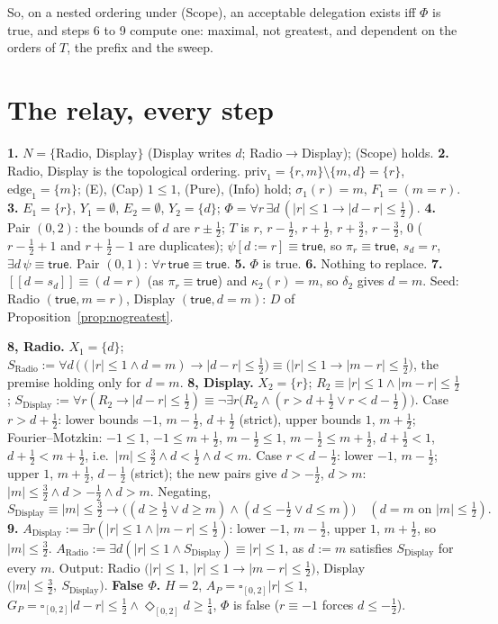 \documentclass[10pt]{article}
\theoremstyle{tplain}\newtheorem{theorem}{Theorem}\newtheorem{lemma}[theorem]{Lemma}\newtheorem{proposition}[theorem]{Proposition}\newtheorem{corollary}[theorem]{Corollary}
\theoremstyle{tdef}\newtheorem{definition}[theorem]{Definition}
\newcommand{\priv}{\mathrm{priv}}\newcommand{\edge}{\mathrm{edge}}
\newcommand{\TRUE}{\mathsf{true}}\newcommand{\FALSE}{\mathsf{false}}
\newcommand{\df}[1]{[\![#1]\!]}
\begin{document}
So, on a nested ordering under (Scope), an acceptable delegation exists iff $\Phi$ is true, and steps 6 to 9 compute one: maximal, not greatest, and dependent on the orders of $T$, the prefix and the sweep.

\section{The relay, every step}\label{sec:relay}
\textbf{1.} $N=\{$Radio, Display$\}$ (Display writes $d$; Radio$\to$Display); (Scope) holds. \textbf{2.} Radio, Display is the topological ordering. $\priv_1=\{r,m\}\setminus\{m,d\}=\{r\}$, $\edge_1=\{m\}$; (E), (Cap) $1\le1$, (Pure), (Info) hold; $\sigma_1(r)=m$, $F_1=(m=r)$. \textbf{3.} $E_1=\{r\}$, $Y_1=\emptyset$, $E_2=\emptyset$, $Y_2=\{d\}$; $\Phi=\forall r\,\exists d\,(|r|\le1\to|d-r|\le\frac12)$. \textbf{4.} Pair $(0,2)$: the bounds of $d$ are $r\pm\frac12$; $T$ is $r$, $r-\frac12$, $r+\frac12$, $r+\frac32$, $r-\frac32$, $0$ ($r-\frac12+1$ and $r+\frac12-1$ are duplicates); $\psi[d:=r]\equiv\TRUE$, so $\pi_r\equiv\TRUE$, $s_d=r$, $\exists d\,\psi\equiv\TRUE$. Pair $(0,1)$: $\forall r\,\TRUE\equiv\TRUE$. \textbf{5.} $\Phi$ is true. \textbf{6.} Nothing to replace. \textbf{7.} $\df{d=s_d}\equiv(d=r)$ (as $\pi_r\equiv\TRUE$) and $\kappa_2(r)=m$, so $\delta_2$ gives $d=m$. Seed: Radio $(\TRUE,m=r)$, Display $(\TRUE,d=m)$: $D$ of Proposition~\ref{prop:nogreatest}.

\textbf{8, Radio.} $X_1=\{d\}$; $S_{\mathrm{Radio}}:=\forall d\,\big((|r|\le1\wedge d=m)\to|d-r|\le\frac12\big)\equiv\big(|r|\le1\to|m-r|\le\frac12\big)$, the premise holding only for $d=m$.
\textbf{8, Display.} $X_2=\{r\}$; $R_2\equiv|r|\le1\wedge|m-r|\le\frac12$; $S_{\mathrm{Display}}:=\forall r(R_2\to|d-r|\le\frac12)\equiv\neg\exists r\big(R_2\wedge(r>d+\frac12\vee r<d-\frac12)\big)$. Case $r>d+\frac12$: lower bounds $-1$, $m-\frac12$, $d+\frac12$ (strict), upper bounds $1$, $m+\frac12$; Fourier--Motzkin: $-1\le1$, $-1\le m+\frac12$, $m-\frac12\le1$, $m-\frac12\le m+\frac12$, $d+\frac12<1$, $d+\frac12<m+\frac12$, i.e.\ $|m|\le\frac32\wedge d<\frac12\wedge d<m$. Case $r<d-\frac12$: lower $-1$, $m-\frac12$; upper $1$, $m+\frac12$, $d-\frac12$ (strict); the new pairs give $d>-\frac12$, $d>m$: $|m|\le\frac32\wedge d>-\frac12\wedge d>m$. Negating,
\[S_{\mathrm{Display}}\equiv|m|\le\tfrac32\to\big((d\ge\tfrac12\vee d\ge m)\wedge(d\le-\tfrac12\vee d\le m)\big)\quad(d=m\text{ on }|m|\le\tfrac12).\]
\textbf{9.} $A_{\mathrm{Display}}:=\exists r(|r|\le1\wedge|m-r|\le\frac12)$: lower $-1$, $m-\frac12$, upper $1$, $m+\frac12$, so $|m|\le\frac32$. $A_{\mathrm{Radio}}:=\exists d(|r|\le1\wedge S_{\mathrm{Display}})\equiv|r|\le1$, as $d:=m$ satisfies $S_{\mathrm{Display}}$ for every $m$. Output: Radio $\big(|r|\le1,\ |r|\le1\to|m-r|\le\frac12\big)$, Display $\big(|m|\le\frac32,\ S_{\mathrm{Display}}\big)$. \textbf{False $\Phi$.} $H=2$, $A_P=\square_{[0,2]}|r|\le1$, $G_P=\square_{[0,2]}|d-r|\le\frac12\wedge\Diamond_{[0,2]}d\ge\frac14$, $\Phi$ is false ($r\equiv-1$ forces $d\le-\frac12$).
\end{document}
